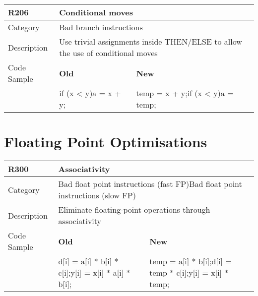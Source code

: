 \begin{tabular}{|p{0.9in}|p{2.0in}|p{2.0in}|} \hline
\textbf{R206}       & \multicolumn{2}{|p{4.0in}|}{\textbf{Conditional moves}} \\ \hline
Category            & \multicolumn{2}{|p{4.0in}|}{Bad branch instructions} \\ \hline
Description         & \multicolumn{2}{|p{4.0in}|}{Use trivial assignments inside THEN/ELSE to allow the use of conditional moves} \\ \hline
Code Sample         & \textbf{Old} & \textbf{New} \\ \hline
                    & if (x <{} y)\newline   a = x + y;
                    & temp = x + y;\newline if (x <{} y)\newline   a = temp;  \\ \hline
\end{tabular}

\section{Floating Point Optimisations}
\label{sec:Floating_Point_Optimizations}

\begin{tabular}{|p{0.9in}|p{2.0in}|p{2.0in}|} \hline
\textbf{R300}       & \multicolumn{2}{|p{4.0in}|}{\textbf{Associativity}} \\ \hline
Category            & \multicolumn{2}{|p{4.0in}|}{Bad float point instructions (fast FP)\newline Bad float point instructions (slow FP)} \\ \hline
Description         & \multicolumn{2}{|p{4.0in}|}{Eliminate floating-point operations through associativity} \\ \hline
Code Sample         & \textbf{Old} & \textbf{New} \\ \hline
                    & d[i] = a[i] * b[i] * c[i];\newline y[i] = x[i] * a[i] * b[i];
                    & temp = a[i] * b[i];\newline d[i] = temp * c[i];\newline y[i] = x[i] * temp;  \\ \hline
\end{tabular}

